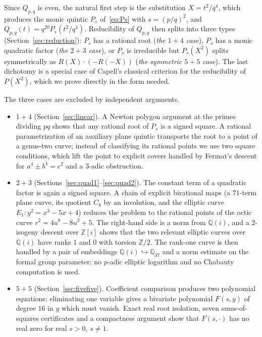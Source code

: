 \documentclass[10pt]{article}
\theoremstyle{definition}
\theoremstyle{remark}
\newcommand{\Q}{\mathbb{Q}}
\newcommand{\Z}{\mathbb{Z}}
\begin{document}
Since $Q_{p,q}$ is even, the natural first step is the substitution
$X=t^2/q^4$, which produces the monic quintic $P_s$ of~\eqref{eq:Ps} with
$s=(p/q)^2$, and $Q_{p,q}(t)=q^{20}P_s(t^2/q^4)$.  Reducibility of
$Q_{p,q}$ then splits into three types (Section~\ref{sec:reduction}): $P_s$
has a rational root (\emph{the $1+4$ case}), $P_s$ has a monic quadratic
factor (\emph{the $2+3$ case}), or $P_s$ is irreducible but $P_s(X^2)$
splits symmetrically as $R(X)\cdot(-R(-X))$ (\emph{the symmetric $5+5$ case}).
The last dichotomy is a special case of Capell's classical criterion for the
reducibility of $P(X^2)$, which we prove directly in the form needed.

The three cases are excluded by independent arguments.
\begin{itemize}
\item \emph{$1+4$} (Section~\ref{sec:linear}).  A Newton polygon argument at
the primes dividing $pq$ shows that any rational root of $P_s$ is a signed
square.  A rational parametrization of an auxiliary plane quintic transports
the root to a point of a genus-two curve; instead of classifying its rational
points we use two square conditions, which lift the point to explicit covers
handled by Fermat's descent for $a^4\pm b^4=c^2$ and a $3$-adic obstruction.
\item \emph{$2+3$} (Sections~\ref{sec:quad1}--\ref{sec:quad2}).  The constant
term of a quadratic factor is again a signed square.  A chain of explicit
birational maps (a $71$-term plane curve, its quotient $C_8$ by an involution,
and the elliptic curve $E_1:y^2=x^3-5x+4$) reduces the problem to the
rational points of the octic curve $r^2=4u^8-8u^2+5$.  The right-hand side is
a norm from $\Q(i)$, and a $2$-isogeny descent over $\Z[i]$ shows that the two
relevant elliptic curves over $\Q(i)$ have ranks $1$ and $0$ with torsion
$\Z/2$.  The rank-one curve is then handled by a pair of embeddings
$\Q(i)\hookrightarrow\Q_{37}$ and a norm estimate on the formal group
parameter; no $p$-adic elliptic logarithm and no Chabauty computation is used.
\item \emph{$5+5$} (Section~\ref{sec:fivefive}).  Coefficient comparison
produces two polynomial equations; eliminating one variable gives a bivariate
polynomial $F(s,y)$ of degree $16$ in $y$ which must vanish.  Exact real root
isolation, seven sums-of-squares certificates and a compactness argument show
that $F(s,\cdot)$ has no real zero for real $s>0$, $s\ne1$.
\end{itemize}
\end{document}
